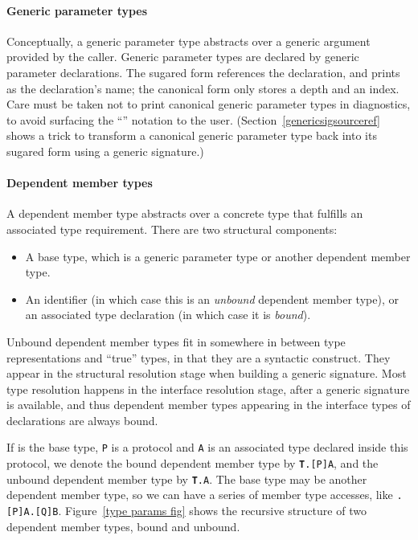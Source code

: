 \documentclass[../generics]{subfiles}
\begin{document}
\paragraph{Generic parameter types} Conceptually, a generic parameter type abstracts over a generic argument provided by the caller. Generic parameter types are declared by generic parameter declarations. The sugared form references the declaration, and prints as the declaration's name; the canonical form only stores a depth and an index. Care must be taken not to print canonical generic parameter types in diagnostics, to avoid surfacing the ``'' notation to the user. (Section~\ref{genericsigsourceref} shows a trick to transform a canonical generic parameter type back into its sugared form using a generic signature.)

\paragraph{Dependent member types}
A dependent member type abstracts over a concrete type that fulfills an associated type requirement. There are two structural components:
\begin{itemize}
\item A base type, which is a generic parameter type or another dependent member type.
\item An identifier (in which case this is an \emph{unbound} dependent member type), or an associated type declaration (in which case it is \emph{bound}).
\end{itemize}

Unbound dependent member types fit in somewhere in between type representations and ``true'' types, in that they are a syntactic construct. They appear in the structural resolution stage when building a generic signature. Most type resolution happens in the interface resolution stage, after a generic signature is available, and thus dependent member types appearing in the interface types of declarations are always bound.

If  is the base type, \texttt{P} is a protocol and \texttt{A} is an associated type declared inside this protocol, we denote the bound dependent member type by \texttt{\textbf{T}.[P]A}, and the unbound dependent member type by \texttt{\textbf{T}.A}. The base type  may be another dependent member type, so we can have a series of member type accesses, like \texttt{.[P]A.[Q]B}. Figure~\ref{type params fig} shows the recursive structure of two dependent member types, bound and unbound.
\end{document}
